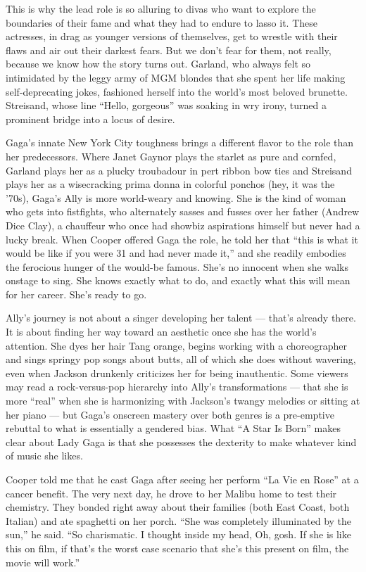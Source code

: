 This is why the lead role is so alluring to divas who want to explore
the boundaries of their fame and what they had to endure to lasso it.
These actresses, in drag as younger versions of themselves, get to
wrestle with their flaws and air out their darkest fears. But we don't
fear for them, not really, because we know how the story turns out.
Garland, who always felt so intimidated by the leggy army of MGM blondes
that she spent her life making self-deprecating jokes, fashioned herself
into the world's most beloved brunette. Streisand, whose line ``Hello,
gorgeous'' was soaking in wry irony, turned a prominent bridge into a
locus of desire.

Gaga's innate New York City toughness brings a different flavor to the
role than her predecessors. Where Janet Gaynor plays the starlet as pure
and cornfed, Garland plays her as a plucky troubadour in pert ribbon bow
ties and Streisand plays her as a wisecracking prima donna in colorful
ponchos (hey, it was the '70s), Gaga's Ally is more world-weary and
knowing. She is the kind of woman who gets into fistfights, who
alternately sasses and fusses over her father (Andrew Dice Clay), a
chauffeur who once had showbiz aspirations himself but never had a lucky
break. When Cooper offered Gaga the role, he told her that ``this is
what it would be like if you were 31 and had never made it,'' and she
readily embodies the ferocious hunger of the would-be famous. She's no
innocent when she walks onstage to sing. She knows exactly what to do,
and exactly what this will mean for her career. She's ready to go.

Ally's journey is not about a singer developing her talent --- that's
already there. It is about finding her way toward an aesthetic once she
has the world's attention. She dyes her hair Tang orange, begins working
with a choreographer and sings springy pop songs about butts, all of
which she does without wavering, even when Jackson drunkenly criticizes
her for being inauthentic. Some viewers may read a rock-versus-pop
hierarchy into Ally's transformations --- that she is more ``real'' when
she is harmonizing with Jackson's twangy melodies or sitting at her
piano --- but Gaga's onscreen mastery over both genres is a pre-emptive
rebuttal to what is essentially a gendered bias. What ``A Star Is Born''
makes clear about Lady Gaga is that she possesses the dexterity to make
whatever kind of music she likes.

Cooper told me that he cast Gaga after seeing her perform ``La Vie en
Rose'' at a cancer benefit. The very next day, he drove to her Malibu
home to test their chemistry. They bonded right away about their
families (both East Coast, both Italian) and ate spaghetti on her porch.
``She was completely illuminated by the sun,'' he said. ``So
charismatic. I thought inside my head, Oh, gosh. If she is like this on
film, if that's the worst case scenario that she's this present on film,
the movie will work.''


